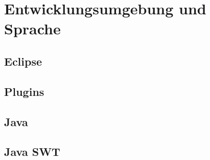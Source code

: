 \paragraph{}



\section{Entwicklungsumgebung und Sprache}
\paragraph{}

\subsection{Eclipse}
\paragraph{}


\subsection{Plugins}
\paragraph{}


\subsection{Java}
\paragraph{}


\subsection{Java SWT}
\paragraph{}